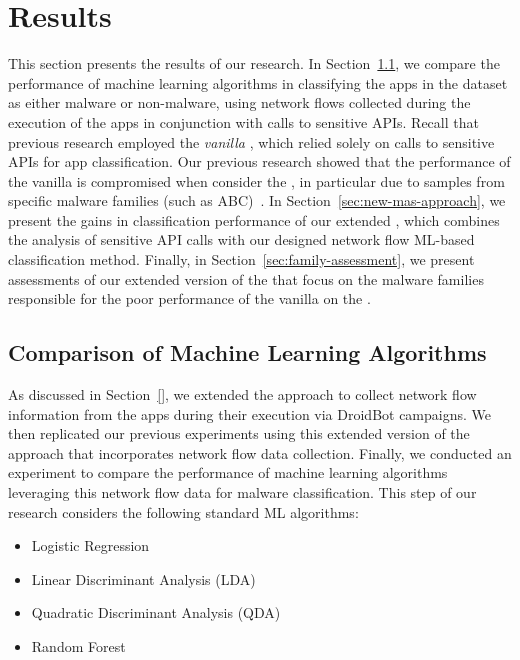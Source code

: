 \section{Results}\label{sec:results}

This section presents the results of our research. In Section~\ref{sec:ml}, we compare the
performance of machine learning algorithms in classifying the apps in the \cds dataset
as either malware or non-malware, using network flows collected during the execution of the apps
in conjunction with calls to sensitive APIs. Recall that previous research employed the \emph{vanilla}
\mas, which relied solely on calls to sensitive APIs for app classification. Our previous
research showed that the performance of the vanilla \mas is compromised when consider
the \cds, in particular due to samples from specific malware families {\color{red}(such as ABC)~\cite{}}.
In Section~\ref{sec:new-mas-approach}, we present the gains in classification performance of our extended \mas,
which combines the analysis of sensitive API calls with our designed network flow ML-based classification method.
Finally, in Section~\ref{sec:family-assessment}, we present assessments of our extended
version of the \mas that focus on the malware families responsible for the poor performance of
the vanilla \mas on the \cds.

\subsection{Comparison of Machine Learning Algorithms}\label{sec:ml}


As discussed {\color{red}in Section~\ref{}}, we extended the \mas{} approach to collect network
flow information from the apps during their execution via DroidBot campaigns.
We then replicated our previous experiments using this extended version of the \mas{} approach
that incorporates network flow data collection. Finally, we conducted an experiment to
compare the performance of machine learning algorithms leveraging this network flow data
for malware classification. This step of our research considers the following standard ML algorithms:

\begin{itemize}
 \item Logistic Regression 
 \item Linear Discriminant Analysis (LDA)
 \item Quadratic Discriminant Analysis (QDA)
 \item Random Forest
\end{itemize}

